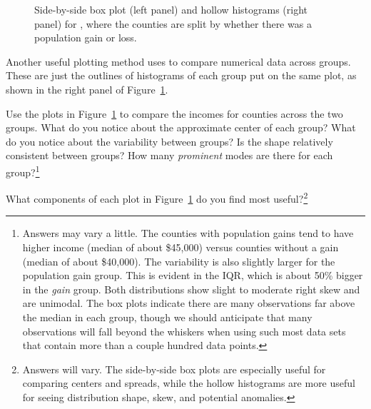 \begin{figure}
  \centering
  \caption{Side-by-side box plot (left panel)
      and hollow histograms (right panel) for
      ,
      where the counties are split by whether there was
      a population gain or loss.}
  \label{countyIncomeSplitByPopGain}
\end{figure}

Another useful plotting method uses  to compare numerical data across groups. These are just the outlines of histograms of each group put on the same plot, as shown in the right panel of Figure~\ref{countyIncomeSplitByPopGain}.

\begin{exercise} \label{comparingPriceByTypeExercise}
Use the plots in Figure~\ref{countyIncomeSplitByPopGain}
to compare the incomes for counties across the two groups.
What do you notice about the approximate center of each group?
What do you notice about the variability between groups?
Is the shape relatively consistent between groups?
How many \emph{prominent} modes are there for each
group?\footnote{Answers may vary a little.
  The counties with population gains tend to have higher
  income (median of about \$45,000) versus counties without
  a gain (median of about \$40,000).
  The variability is also slightly larger for the population
  gain group.
  This is evident in the IQR, which is about 50\% bigger
  in the \emph{gain} group.
  Both distributions show slight to moderate right
  skew
  and are unimodal.
  The box plots indicate there are many observations
  far above the median in each group, though we should
  anticipate that many observations will fall beyond
  the whiskers when using such most data sets that
  contain more than a couple hundred data points.}
\end{exercise}

\begin{exercise}
What components of each plot in Figure~\ref{countyIncomeSplitByPopGain} do you find most useful?\footnote{Answers will vary. The side-by-side box plots are especially useful for comparing centers and spreads, while the hollow histograms are more useful for seeing distribution shape, skew, and potential anomalies.}
\end{exercise}

